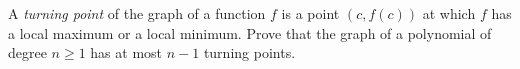 A \emph{turning point} of the graph of a function $f$ is a point $(c,f(c))$ at which $f$ has a local maximum or a local minimum. Prove that the graph of a polynomial of degree $n\ge1$ has at most $n-1$ turning points.
